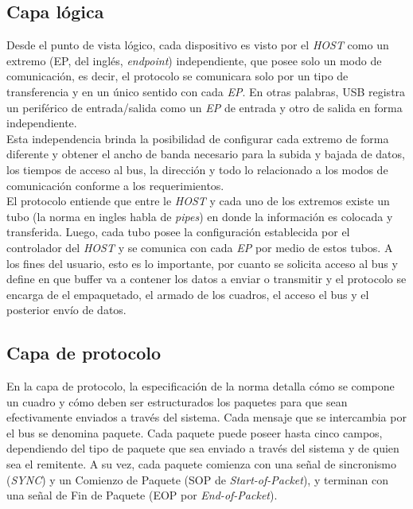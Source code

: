 \subsection{Capa lógica}
	Desde el punto de vista lógico, cada dispositivo es visto por el {\it HOST} como un extremo (EP, del inglés, {\it endpoint}) independiente, que posee solo un modo de comunicación, es decir, el protocolo se comunicara solo por un tipo de transferencia y en un único sentido con cada {\it EP}. En otras palabras, USB registra un periférico de entrada/salida como un {\it EP} de entrada y otro de salida en forma independiente.\\

	Esta independencia brinda la posibilidad de configurar cada extremo de forma diferente y obtener el ancho de banda necesario para la subida y bajada de datos, los tiempos de acceso al bus, la dirección y todo lo relacionado a los modos de comunicación conforme a los requerimientos.\\
	
	El protocolo entiende que entre le {\it HOST} y cada uno de los extremos existe un tubo (la norma en ingles habla de {\it pipes}) en donde la información es colocada y transferida. Luego, cada tubo posee la configuración establecida por el controlador del {\it HOST} y se comunica con cada {\it EP} por medio de estos tubos. A los fines del usuario, esto es lo importante, por cuanto se solicita acceso al bus y define en que buffer va a contener los datos a enviar o transmitir y el protocolo se encarga de el empaquetado, el armado de los cuadros, el acceso el bus y el posterior envío de datos.\\
	
\subsection{Capa de protocolo}
	En la capa de protocolo, la especificación de la norma detalla cómo se compone un cuadro y cómo deben ser estructurados los paquetes para que sean efectivamente enviados a través del sistema. Cada mensaje que se intercambia por el bus se denomina paquete. Cada paquete puede poseer hasta cinco campos, dependiendo del tipo de paquete que sea enviado a través del sistema y de quien sea el remitente. A su vez, cada paquete comienza con una señal de sincronismo ({\it SYNC}) y un Comienzo de Paquete (SOP de {\it Start-of-Packet}), y terminan con una señal de Fin de Paquete (EOP por {\it End-of-Packet}).\\
	
